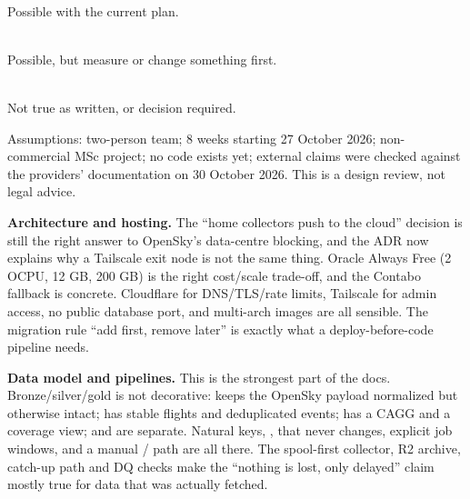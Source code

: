 \documentclass[10.5pt]{article}
\begin{document}
\vspace{3pt}
\begin{minipage}[t]{0.32\linewidth}
\\[2pt]
{\small Possible with the current plan.}
\end{minipage}\hfill
\begin{minipage}[t]{0.32\linewidth}
\\[2pt]
{\small Possible, but measure or change something first.}
\end{minipage}\hfill
\begin{minipage}[t]{0.32\linewidth}
\\[2pt]
{\small Not true as written, or decision required.}
\end{minipage}

\vspace{4pt}
{\small\color{papermuted}
Assumptions: two-person team; 8 weeks starting 27 October 2026; non-commercial MSc project; no code exists yet; external claims were checked against the providers' documentation on 30 October 2026. This is a design review, not legal advice.
}


\begin{card}
{\bfseries Architecture and hosting.} The ``home collectors push to the cloud'' decision is still the right answer to OpenSky's data-centre blocking, and the ADR now explains why a Tailscale exit node is not the same thing. Oracle Always Free (2 OCPU, 12 GB, 200 GB) is the right cost/scale trade-off, and the Contabo fallback is concrete. Cloudflare for DNS/TLS/rate limits, Tailscale for admin access, no public database port, and multi-arch images are all sensible. The migration rule ``add first, remove later'' is exactly what a deploy-before-code pipeline needs.
\end{card}

\vspace{3pt}
\begin{card}
{\bfseries Data model and pipelines.} This is the strongest part of the docs. Bronze/silver/gold is not decorative:  keeps the OpenSky payload normalized but otherwise intact;  has stable flights and deduplicated events;  has a CAGG and a coverage view;  and  are separate. Natural keys, ,  that never changes, explicit job windows, and a manual / path are all there. The spool-first collector, R2 archive, catch-up path and DQ checks make the ``nothing is lost, only delayed'' claim mostly true for data that was actually fetched.
\end{card}
\end{document}
